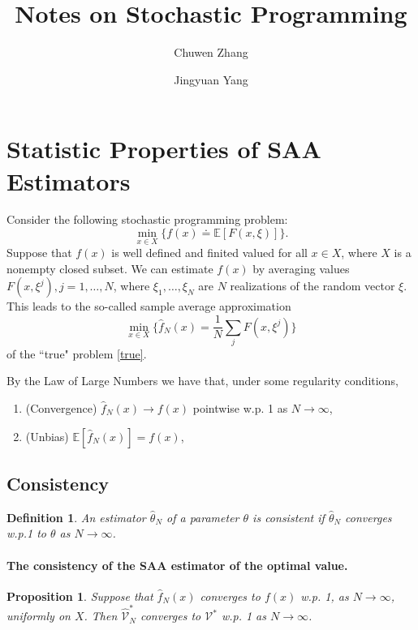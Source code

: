 \documentclass[a4pper,11pt]{article}
\title{Notes on Stochastic Programming}
\newcommand{\be}{\mathbb E}
\newtheorem{defn}[thm]{Definition}
\newtheorem{prop}[thm]{Proposition}
\begin{document}
\author[1]{\small Chuwen Zhang}
\author[1]{\small Jingyuan Yang}
\maketitle

\section{Statistic Properties of SAA Estimators}
Consider the following stochastic programming problem:
\begin{equation}
	\min_{x\in X} \{f(x)\doteq \be [F(x,\xi)]\}.\label{true}
\end{equation}
Suppose that $f(x)$ is well defined and finited valued for all $x\in X$, where $X$ is a nonempty closed subset.
We can estimate $f(x)$ by averaging values $F(x,\xi^j),j=1,…,N$, where $\xi_1,\dots,\xi_N$ are $N$ realizations of the random vector $\xi$. This leads to the so-called sample average approximation
\begin{equation}
	\min_{x\in X}\{\hat f_N(x)=\frac{1}{N}\sum_{j}F(x,\xi^j)\}\label{SAA}
\end{equation}
of the ``true" problem \eqref{true}.

By the Law of Large Numbers we have that, under some regularity conditions,
\begin{enumerate}
	\item (Convergence) $\hat f_N(x)\to f(x)$ pointwise w.p. 1 as $N\to \infty$,
	\item (Unbias) $\be [\hat f_N(x)]=f(x)$,
\end{enumerate}
\subsection{Consistency}
\begin{defn}
	An estimator $\hat \theta_N$ of a parameter $\theta$ is consistent if $\hat \theta_N$ converges w.p.1 to $\theta$ as $N\to \infty$.
\end{defn}



\paragraph{The consistency of the SAA estimator of the optimal value.}
\begin{prop}
	Suppose that $\hat f_N(x)$ converges to $f(x)$ w.p. 1, as $N\to \infty$, uniformly on $X$. Then $\hat {\mathcal V}_N^*$ converges to $\mathcal V^*$ w.p. 1 as $N\to \infty$.
\end{prop}
\end{document}
